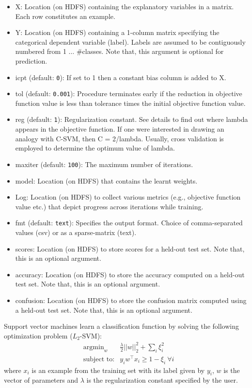 \begin{itemize}
\item X: Location (on HDFS) containing the explanatory variables 
in a matrix. Each row constitutes an example.
\item Y: Location (on HDFS) containing a 1-column matrix specifying 
the categorical dependent variable (label). Labels are assumed to be 
contiguously numbered from 1 $\ldots$ \#classes.  Note that, this 
argument is optional for prediction.
\item icpt (default: {\tt 0}): If set to 1 then a constant bias column
is added to X.
\item tol (default: {\tt 0.001}): Procedure terminates early if the reduction
in objective function value is less than tolerance times the initial objective
function value.
\item reg (default: {\tt 1}): Regularization constant. See details to find 
out where lambda appears in the objective function. If one were interested 
in drawing an analogy with C-SVM, then C = 2/lambda. Usually, cross validation 
is employed to determine the optimum value of lambda.
\item maxiter (default: {\tt 100}): The maximum number of iterations.
\item model: Location (on HDFS) that contains the learnt weights.
\item Log: Location (on HDFS) to collect various metrics (e.g., objective 
function value etc.) that depict progress across iterations while training.
\item fmt (default: {\tt text}): Specifies the output format. Choice of 
comma-separated values (csv) or as a sparse-matrix (text).
\item scores: Location (on HDFS) to store scores for a held-out test set.
Note that, this is an optional argument.
\item accuracy: Location (on HDFS) to store the accuracy computed on a
held-out test set. Note that, this is an optional argument.
\item confusion: Location (on HDFS) to store the confusion matrix
computed using a held-out test set. Note that, this is an optional 
argument.
\end{itemize}


Support vector machines learn a classification function by solving the
following optimization problem ($L_2$-SVM):
\begin{eqnarray*}
&\textrm{argmin}_w& \frac{\lambda}{2} ||w||_2^2 + \sum_i \xi_i^2\\
&\textrm{subject to:}& y_i w^{\top} x_i \geq 1 - \xi_i ~ \forall i
\end{eqnarray*}
where $x_i$ is an example from the training set with its label given by $y_i$, 
$w$ is the vector of parameters and $\lambda$ is the regularization constant 
specified by the user.

